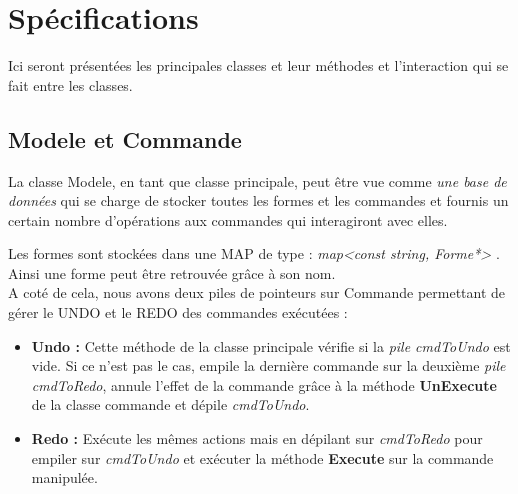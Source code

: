 \documentclass[12pt]{article}
\begin{document}
\section{Spécifications}
Ici seront présentées les principales classes et leur méthodes et l’interaction qui se fait entre les classes.
\subsection{Modele et Commande}
La classe Modele, en tant que classe principale, peut être vue comme \textit{ une base de données} qui se charge de stocker toutes les formes et les commandes et fournis un certain nombre d’opérations aux commandes qui interagiront avec elles. 

Les formes sont stockées dans une MAP de type : \textit{ map<const string, Forme*> }. Ainsi une forme peut être retrouvée grâce à son nom.
\\A coté de cela, nous avons deux piles de pointeurs sur Commande permettant de gérer le UNDO et le REDO des commandes exécutées : 
\newline
\begin{itemize}
\item \textbf{Undo :} Cette méthode de la classe principale vérifie si la \textit{ pile cmdToUndo} est vide. Si ce n'est pas le cas, empile la dernière commande sur la deuxième \textit{pile cmdToRedo}, annule l'effet de la commande grâce à la méthode \textbf{UnExecute} de la classe commande et dépile \textit{cmdToUndo}.
\item \textbf{Redo :} Exécute les mêmes actions mais en dépilant sur	\textit{cmdToRedo} pour empiler sur \textit{cmdToUndo} et exécuter la méthode \textbf{Execute} sur la commande manipulée.
\end{itemize}
\end{document}
